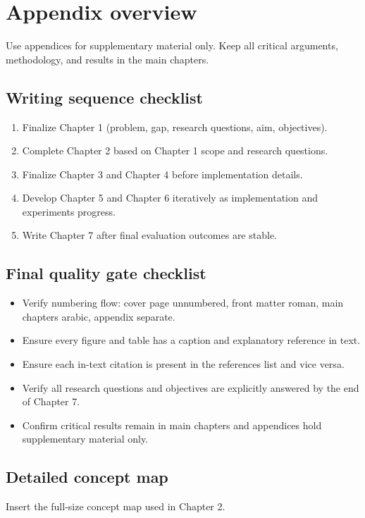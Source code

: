 \chapter{Appendix overview}
Use appendices for supplementary material only. Keep all critical arguments, methodology, and results in the main chapters.

\section{Writing sequence checklist}
\begin{enumerate}
    \item Finalize Chapter 1 (problem, gap, research questions, aim, objectives).
    \item Complete Chapter 2 based on Chapter 1 scope and research questions.
    \item Finalize Chapter 3 and Chapter 4 before implementation details.
    \item Develop Chapter 5 and Chapter 6 iteratively as implementation and experiments progress.
    \item Write Chapter 7 after final evaluation outcomes are stable.
\end{enumerate}

\section{Final quality gate checklist}
\begin{itemize}
    \item Verify numbering flow: cover page unnumbered, front matter roman, main chapters arabic, appendix separate.
    \item Ensure every figure and table has a caption and explanatory reference in text.
    \item Ensure each in-text citation is present in the references list and vice versa.
    \item Verify all research questions and objectives are explicitly answered by the end of Chapter 7.
    \item Confirm critical results remain in main chapters and appendices hold supplementary material only.
\end{itemize}

\section{Detailed concept map}
Insert the full-size concept map used in Chapter 2.

